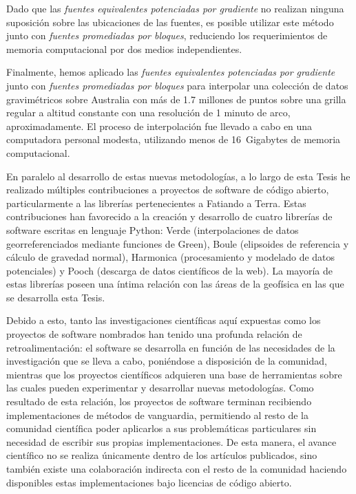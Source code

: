Dado que las \emph{fuentes equivalentes potenciadas por gradiente} no realizan
ninguna suposición sobre las ubicaciones de las fuentes, es posible utilizar
este método junto con \emph{fuentes promediadas por bloques}, reduciendo los
requerimientos de memoria computacional por dos medios independientes.

Finalmente, hemos aplicado las \emph{fuentes equivalentes potenciadas por
gradiente} junto con \emph{fuentes promediadas por bloques} para interpolar una
colección de datos gravimétricos sobre Australia con más de 1.7 millones de
puntos sobre una grilla regular a altitud constante con una resolución de
1 minuto de arco, aproximadamente.
El proceso de interpolación fue llevado a cabo en una computadora personal
modesta, utilizando menos de 16~Gigabytes de memoria computacional.

\vspace{1em}

En paralelo al desarrollo de estas nuevas metodologías, a lo largo de esta
Tesis he realizado múltiples contribuciones a proyectos de software de código
abierto, particularmente a las librerías pertenecientes a Fatiando a Terra.
Estas contribuciones han favorecido a la creación y desarrollo de cuatro
librerías de software escritas en lenguaje Python: Verde (interpolaciones de
datos georreferenciados mediante funciones de Green), Boule (elipsoides de
referencia y cálculo de gravedad normal), Harmonica (procesamiento y modelado
de datos potenciales) y Pooch (descarga de datos científicos de la web).
La mayoría de estas librerías poseen una íntima relación con las áreas de la
geofísica en las que se desarrolla esta Tesis.

Debido a esto, tanto las investigaciones científicas aquí expuestas como los
proyectos de software nombrados han tenido una profunda relación de
retroalimentación: el software se desarrolla en función de las necesidades de
la investigación que se lleva a cabo, poniéndose a disposición de la comunidad,
mientras que los proyectos científicos adquieren una base de herramientas
sobre las cuales pueden experimentar y desarrollar nuevas metodologías.
Como resultado de esta relación, los proyectos de software terminan recibiendo
implementaciones de métodos de vanguardia, permitiendo al resto de la comunidad
científica poder aplicarlos a sus problemáticas particulares sin necesidad de
escribir sus propias implementaciones.
De esta manera, el avance científico no se realiza únicamente dentro de los
artículos publicados, sino también existe una colaboración indirecta con el
resto de la comunidad haciendo disponibles estas implementaciones bajo
licencias de código abierto.


